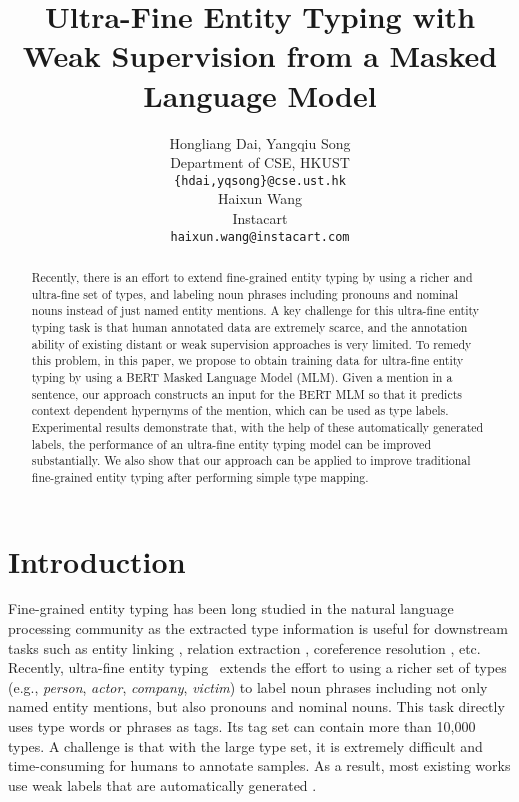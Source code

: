 \documentclass[11pt,a4paper]{article}
\title{Ultra-Fine Entity Typing with Weak Supervision from a Masked Language Model}
\author{Hongliang Dai, Yangqiu Song \\
  Department of CSE, HKUST \\
  \texttt{\{hdai,yqsong\}@cse.ust.hk} \\\And
  Haixun Wang \\
  Instacart \\
  \texttt{haixun.wang@instacart.com} \\}
\date{}
\begin{document}
\maketitle
\begin{abstract}


Recently, there is an effort to extend fine-grained entity typing by using a richer and ultra-fine set of types, and labeling noun phrases including pronouns and nominal nouns instead of just named entity mentions. A key challenge for this ultra-fine entity typing task is that human annotated data are extremely scarce, and the annotation ability of existing distant or weak supervision approaches is very limited.
To remedy this problem, in this paper, we propose to obtain training data for ultra-fine entity typing by using a BERT Masked Language Model (MLM). Given a mention in a sentence, our approach constructs an input for the BERT MLM so that it predicts context dependent hypernyms of the mention, which can be used as type labels. Experimental results demonstrate that, with the help of these automatically generated labels, the performance of an ultra-fine entity typing model can be improved substantially. We also show that our approach can be applied to improve traditional fine-grained entity typing after performing simple type mapping.
\end{abstract}

\section{Introduction}
Fine-grained entity typing \cite{ling2012fine} has been long studied in the natural language processing community as the extracted type information is useful for downstream tasks such as entity linking \cite{ling2015design,onoe2020interpretable}, relation extraction \cite{koch2014type}, coreference resolution \cite{onoe2020interpretable}, etc.
Recently, ultra-fine entity typing~\cite{choi2018ultra} extends the effort to using a richer set of types (e.g., \textit{person}, \textit{actor}, \textit{company}, \textit{victim}) to label noun phrases including not only named entity mentions, but also pronouns and nominal nouns.
This task directly uses type words or phrases as tags. Its tag set can contain more than 10,000 types.
A challenge is that with the large type set, it is extremely difficult and time-consuming for humans to annotate samples. As a result, most existing {works use weak labels that are automatically generated} \cite{ling2012fine,choi2018ultra,lee2020chinese}. 
\end{document}
